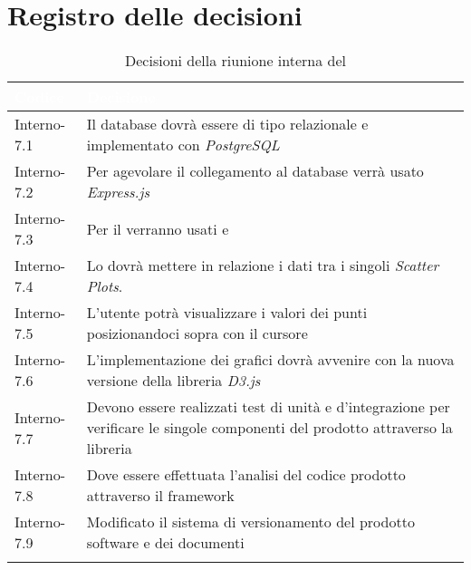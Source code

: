 \section{Registro delle decisioni}
{
\renewcommand{\arraystretch}{1.5}
\centering
\begin{longtable}{C{3cm} C{9cm}}
\textcolor{white}{\textbf{Codice}}&
\textcolor{white}{\textbf{Decisione}}\\	

\endhead
		
Interno-7.1 & Il database dovrà essere di tipo relazionale e implementato con \textit{PostgreSQL}\\
Interno-7.2 & Per agevolare il collegamento al database verrà usato \textit{Express.js}\\
Interno-7.3 & Per il  verranno usati \textit{} e \textit{}\\
Interno-7.4 & Lo \textit{} dovrà mettere in relazione i dati tra i singoli \textit{Scatter Plots}.\\
Interno-7.5 & L'utente potrà visualizzare i valori dei punti posizionandoci sopra con il cursore\\
Interno-7.6 & L'implementazione dei grafici dovrà avvenire con la nuova versione della libreria \textit{D3.js}\\
Interno-7.7 & Devono essere realizzati test di unità e d'integrazione per
verificare le singole componenti del prodotto attraverso la libreria \textit{}\\
Interno-7.8 & Dove essere effettuata l'analisi del codice prodotto attraverso il framework \textit{}\\
Interno-7.9 & Modificato il sistema di versionamento del prodotto software e dei documenti\\
\caption{Decisioni della riunione interna del \Data{}}
\end{longtable}
}
